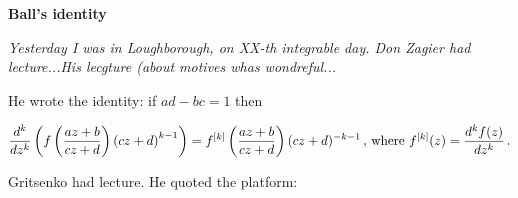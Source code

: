 






\baselineskip=14pt
\def\vare {\varepsilon}
\def\A {{\bf A}}
\def\t {\tilde}
\def\a {\alpha}
\def\K {{\bf K}}
\def\N {{\bf N}}
\def\w {\omega}
\def\s {{\sigma}}
\def\S {{\Sigma}}
\def\s {{\sigma}}
\def\p{\partial}
\def\vare{{\varepsilon}}
\def\Q {{\bf Q}}
\def\D {{\cal D}}
\def\G {{\Gamma}}
\def\C {{\bf C}}
\def\L {{\cal L}}
\def\Z {{\bf Z}}
\def\U  {{\cal U}}
\def\H {{\cal H}}
\def\R  {{\bf R}}
\def\S  {{\bf S}}
\def\E  {{\bf E}}
\def\l {\lambda}
\def\degree {{\bf {\rm degree}\,\,}}
\def \finish {${\,\,\vrule height1mm depth2mm width 8pt}$}
\def \m {\medskip}
\def\p {\partial}
\def\r {{\bf r}}
\def\pt {{\bf pt}}
\def\v {{\bf v}}
\def\n {{\bf n}}
\def\t {{\bf t}}
\def\b {{\bf b}}
\def\c {{\bf c }}
\def\e{{\bf e}}
\def\ac {{\bf a}}
\def \X   {{\bf X}}
\def \Y   {{\bf Y}}
\def \x   {{\bf x}}
\def \y   {{\bf y}}
\def \G{{\cal G}}
\def\ss  {\sigma_{\rm sph}}
\def\grad {{\rm grad\,}}


\centerline {\bf Ball's identity}

{\it Yesterday I was in Loughborough, on XX-th 
integrable day. Don Zagier had lecture...His lecgture (about motives whas wondreful...} 

He wrote the identity: if $ad-bc=1$ then

                  $$
{d^k\over dz^k}\left(f\left(az+b\over cz+d\right)
       \left(cz+d\right)^{k-1}\right)=
                f^{[k]}\left({az+b\over cz+d}\right)
       (cz+d)^{-k-1}\,,\,{\rm where}
     \,\,
     f^{[k]}(z)={d^k f(z)\over dz^k}\,.
                  $$

Gritsenko had lecture. He quoted the platform:
\bye
